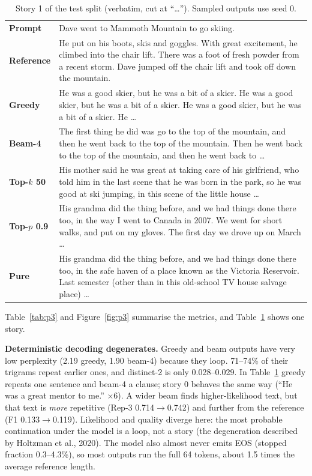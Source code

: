 \documentclass[11pt,a4paper]{article}
\begin{document}
\begin{table}[t]
\centering\footnotesize
\caption{Story 1 of the test split (verbatim, cut at ``\ldots''). Sampled outputs use seed 0.}
\label{tab:gen}
\begin{tabular}{@{}>{\bfseries}l p{}@{}}
\toprule
Prompt & Dave went to Mammoth Mountain to go skiing.\\
Reference & He put on his boots, skis and goggles. With great excitement, he climbed into the chair lift. There was a foot of fresh powder from a recent storm. Dave jumped off the chair lift and took off down the mountain.\\
\midrule
Greedy & He was a good skier, but he was a bit of a skier. He was a good skier, but he was a bit of a skier. He was a good skier, but he was a bit of a skier. He \ldots\\
Beam-4 & The first thing he did was go to the top of the mountain, and then he went back to the top of the mountain. Then he went back to the top of the mountain, and then he went back to \ldots\\
Top-$k$ 50 & His mother said he was great at taking care of his girlfriend, who told him in the last scene that he was born in the park, so he was good at ski jumping, in this scene of the little house \ldots\\
Top-$p$ 0.9 & His grandma did the thing before, and we had things done there too, in the way I went to Canada in 2007. We went for short walks, and put on my gloves. The first day we drove up on March \ldots\\
Pure & His grandma did the thing before, and we had things done there too, in the safe haven of a place known as the Victoria Reservoir. Last semester (other than in this old-school TV house salvage place) \ldots\\
\bottomrule
\end{tabular}
\end{table}

Table~\ref{tab:p3} and Figure~\ref{fig:p3} summarise the metrics, and Table~\ref{tab:gen} shows one story.

\textbf{Deterministic decoding degenerates.} Greedy and beam outputs have very low perplexity (2.19 greedy, 1.90 beam-4) because they loop. 71--74\% of their trigrams repeat earlier ones, and distinct-2 is only 0.028--0.029. In Table~\ref{tab:gen} greedy repeats one sentence and beam-4 a clause; story 0 behaves the same way (``He was a great mentor to me.'' $\times$6). A wider beam finds higher-likelihood text, but that text is \emph{more} repetitive (Rep-3 0.714$\to$0.742) and further from the reference (F1 0.133$\to$0.119). Likelihood and quality diverge here: the most probable continuation under the model is a loop, not a story (the degeneration described by Holtzman et al., 2020). The model also almost never emits EOS (stopped fraction 0.3--4.3\%), so most outputs run the full 64 tokens, about 1.5 times the average reference length.
\end{document}
